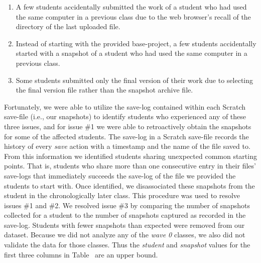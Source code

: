 \begin{enumerate}
\item A few students accidentally submitted the work of a student who had used
  the same computer in a previous class due to the web browser's recall of the
  directory of the last uploaded file.
\item Instead of starting with the provided base-project, a few students
  accidentally started with a snapshot of a student who had used the same
  computer in a previous class.
\item Some students submitted only the final version of their work due to
  selecting the final version file rather than the snapshot archive file.
\end{enumerate}

Fortunately, we were able to utilize the save-log contained within each Scratch
save-file (i.e., our snapshots) to identify students who experienced any of
these three issues, and for issue \#1 we were able to retroactively obtain the
snapshots for some of the affected students. The save-log in a Scratch
save-file records the history of every \emph{save} action with a timestamp and
the name of the file saved to. From this information we identified students
sharing unexpected common starting points. That is, students who share more
than one consecutive entry in their files' save-logs that immediately succeeds
the save-log of the file we provided the students to start with. Once
identified, we disassociated these snapshots from the student in the
chronologically later class. This procedure was used to resolve issues \#1 and
\#2. We resolved issue \#3 by comparing the number of snapshots collected for a
student to the number of snapshots captured as recorded in the
save-log. Students with fewer snapshots than expected were removed from our
dataset. Because we did not analyze any of the \emph{wave 0} classes, we also
did not validate the data for those classes. Thus the \emph{student} and
\emph{snapshot} values for the first three columns in
Table~ are an upper bound.
